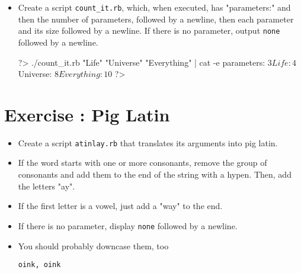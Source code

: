 \documentclass{42-en}
\begin{document}

\begin{itemize}

\item Create a script \texttt{count\_it.rb}, which, when executed, has "parameters:" and then the number of parameters, followed by a newline, then each parameter and its size followed by a newline. If there is no parameter, output \texttt{none} followed by a newline. 

\begin{42console}
	?> ./count_it.rb "Life" "Universe" "Everything" | cat -e
	parameters: 3$
	Life: 4$
	Universe: 8$
	Everything: 10$
	?>
\end{42console}

\end{itemize}




\chapter{Exercise \exercicenumber: Pig Latin}

\exnumber{\exercicenumber}


\begin{itemize}

\item Create a script \texttt{atinlay.rb} that translates its arguments into pig latin.
\item If the word starts with one or more consonants, remove the group of consonants and add them to the end of the string with a hypen. Then, add the letters "ay". 
\item If the first letter is a vowel, just add a "way" to the end. 
\item If there is no parameter, display \texttt{none} followed by a newline.
\item You should probably downcase them, too


\texttt{oink, oink}

\end{itemize}
\end{document}

